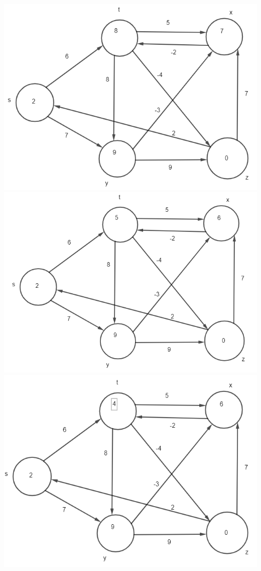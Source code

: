 \documentclass[12pt]{article}
\begin{document}
\begin{enumerate}
\includegraphics[scale=.65]{24.1-1 Vertex Z/First Iteration.png}\\
\includegraphics[scale=.65]{24.1-1 Vertex Z/Second Iteration.png}\\
\includegraphics[scale=.65]{24.1-1 Vertex Z/Third Iteration.png}\\

\end{enumerate}
\end{document}
